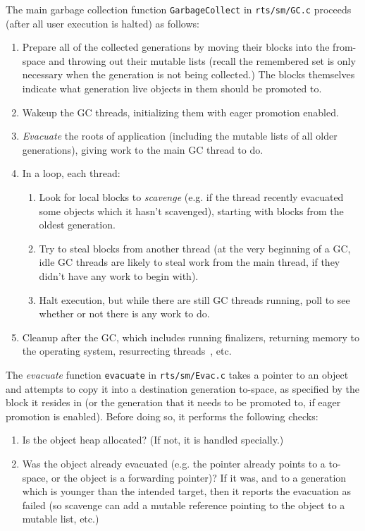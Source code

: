 The main garbage collection function
\verb|GarbageCollect| in \verb|rts/sm/GC.c| proceeds (after all user
execution is halted) as follows:

\begin{enumerate}
    \item Prepare all of the collected generations by moving their blocks
        into the from-space and throwing out their mutable lists (recall the remembered
        set is only necessary when the generation is not being collected.)
        The blocks themselves indicate what generation live objects in them should be promoted to.
    \item Wakeup the GC threads, initializing them with eager promotion enabled.
    \item \emph{Evacuate} the roots of application (including the mutable lists of all older generations), giving work to the main GC thread to do.
    \item In a loop, each thread:
        \begin{enumerate}
            \item Look for local blocks to \emph{scavenge} (e.g. if the thread recently evacuated some objects which it hasn't scavenged), starting with blocks from the oldest generation.
            \item Try to steal blocks from another thread (at the very beginning of a GC, idle GC threads are likely to steal work from the main thread, if they didn't have any work to begin with).
            \item Halt execution, but while there are still GC threads running, poll to see whether or not there is any work to do.
        \end{enumerate}
    \item Cleanup after the GC, which includes running finalizers, returning memory to the operating system, resurrecting threads~\XXX, etc.
\end{enumerate}

The \emph{evacuate} function \verb|evacuate| in \verb|rts/sm/Evac.c|
takes a pointer to an object and attempts to copy it into a destination
generation to-space, as specified by the block it resides in (or the generation that
it needs to be promoted to, if eager promotion is enabled).  Before doing so,
it performs the following checks:

\begin{enumerate}
    \item Is the object heap allocated? (If not, it is handled specially.)
    \item Was the object already evacuated (e.g. the pointer already points
        to a to-space, or the object is a forwarding pointer)?  If it
        was, and to a generation which is younger than the intended
        target, then it reports the evacuation as failed (so scavenge
        can add a mutable reference pointing to the object to a mutable
        list, etc.)
\end{enumerate}


